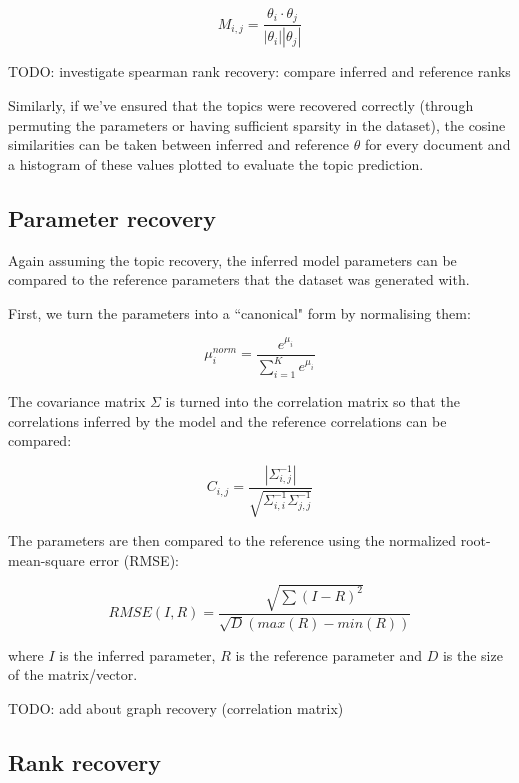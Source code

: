 \documentclass[12pt,a4paper,twoside,openright]{report}
\begin{document}
\begin{equation}\label{eq:document_similarity_matrix}
M_{i,j} = \frac{\theta_i \cdot \theta_j}{|\theta_i||\theta_j|}
\end{equation}

TODO: investigate spearman rank recovery: compare inferred and reference ranks

Similarly, if we've ensured that the topics were recovered correctly (through permuting the parameters or having sufficient sparsity in the dataset), the cosine similarities can be taken between inferred and reference $\theta$ for every document and a histogram of these values plotted to evaluate the topic prediction.

\subsection{Parameter recovery}

Again assuming the topic recovery, the inferred model parameters can be compared to the reference parameters that the dataset was generated with.

First, we turn the parameters into a ``canonical" form by normalising them:

\begin{equation}
\mu^{norm}_i = \frac{e^{\mu_i}}{\sum\limits_{i=1}^K{e^{\mu_i}}}
\end{equation}

The covariance matrix $\Sigma$ is turned into the correlation matrix so that the correlations inferred by the model and the reference correlations can be compared:

\begin{equation}
C_{i, j} = \frac{|\Sigma^{-1}_{i, j}|}{\sqrt{\Sigma^{-1}_{i, i}\Sigma^{-1}_{j, j}}}
\end{equation}

The parameters are then compared to the reference using the normalized root-mean-square error (RMSE):

\begin{equation}
\mathit{RMSE}(I, R) = \frac{\sqrt{\sum{(I-R)^2}}}{\sqrt{D}(max(R) - min(R))}
\end{equation}

where $I$ is the inferred parameter, $R$ is the reference parameter and $D$ is the size of the matrix/vector.

TODO: add about graph recovery (correlation matrix)

\subsection{Rank recovery}
\end{document}
